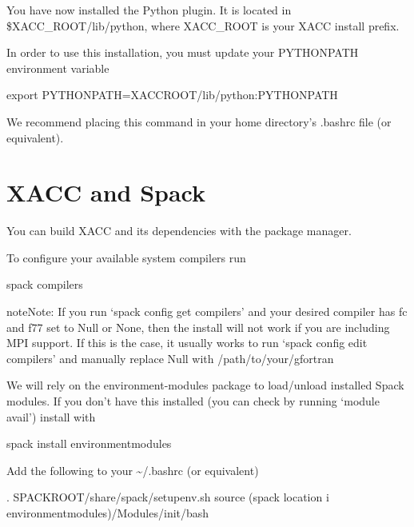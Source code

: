 \documentclass[letterpaper,10pt,english]{sphinxmanual}
\begin{document}
You have now installed the Python plugin. It is located in \$XACC\_ROOT/lib/python,
where XACC\_ROOT is your XACC install prefix.

In order to use this installation, you must update your PYTHONPATH environment variable

\begin{sphinxVerbatim}[commandchars=\\\{\}]
\PYGZdl{} export PYTHONPATH=\PYGZdl{}XACC\PYGZus{}ROOT/lib/python:\PYGZdl{}PYTHONPATH
\end{sphinxVerbatim}

We recommend placing this command in your home directory’s .bashrc file (or equivalent).


\section{XACC and Spack}
\label{\detokenize{install:xacc-and-spack}}
You can build XACC and its dependencies with the  package manager.

To configure your available system compilers run

\begin{sphinxVerbatim}[commandchars=\\\{\}]
\PYGZdl{} spack compilers
\end{sphinxVerbatim}

\begin{sphinxadmonition}{note}{Note:}
If you run ‘spack config get compilers’ and your desired
compiler has fc and f77 set to Null or None, then the
install will not work if you are including MPI support.
If this is the case, it usually
works to run ‘spack config edit compilers’ and
manually replace Null with /path/to/your/gfortran
\end{sphinxadmonition}

We will rely on the environment-modules package to load/unload
installed Spack modules. If you don’t have this installed
(you can check by running ‘module avail’) install with

\begin{sphinxVerbatim}[commandchars=\\\{\}]
\PYGZdl{} spack install environment\PYGZhy{}modules
\end{sphinxVerbatim}

Add the following to your \textasciitilde{}/.bashrc (or equivalent)

\begin{sphinxVerbatim}[commandchars=\\\{\}]
. \PYGZdl{}SPACK\PYGZus{}ROOT/share/spack/setup\PYGZhy{}env.sh
source \PYGZdl{}(spack location \PYGZhy{}i environment\PYGZhy{}modules)/Modules/init/bash
\end{sphinxVerbatim}
\end{document}
